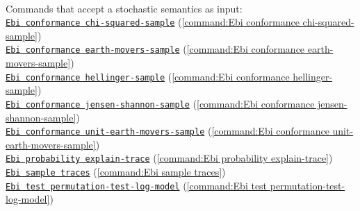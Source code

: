 {\\Commands that accept a stochastic semantics as input: \\\null\qquad\hyperref[command:Ebi conformance chi-squared-sample]{\texttt{Ebi conformance chi-squared-sample}} (\cref{command:Ebi conformance chi-squared-sample})\\\null\qquad\hyperref[command:Ebi conformance earth-movers-sample]{\texttt{Ebi conformance earth-movers-sample}} (\cref{command:Ebi conformance earth-movers-sample})\\\null\qquad\hyperref[command:Ebi conformance hellinger-sample]{\texttt{Ebi conformance hellinger-sample}} (\cref{command:Ebi conformance hellinger-sample})\\\null\qquad\hyperref[command:Ebi conformance jensen-shannon-sample]{\texttt{Ebi conformance jensen-shannon-sample}} (\cref{command:Ebi conformance jensen-shannon-sample})\\\null\qquad\hyperref[command:Ebi conformance unit-earth-movers-sample]{\texttt{Ebi conformance unit-earth-movers-sample}} (\cref{command:Ebi conformance unit-earth-movers-sample})\\\null\qquad\hyperref[command:Ebi probability explain-trace]{\texttt{Ebi probability explain-trace}} (\cref{command:Ebi probability explain-trace})\\\null\qquad\hyperref[command:Ebi sample traces]{\texttt{Ebi sample traces}} (\cref{command:Ebi sample traces})\\\null\qquad\hyperref[command:Ebi test permutation-test-log-model]{\texttt{Ebi test permutation-test-log-model}} (\cref{command:Ebi test permutation-test-log-model})
}
